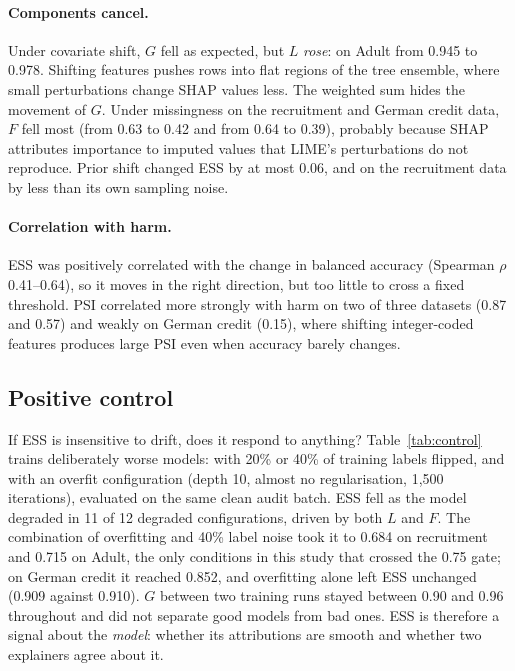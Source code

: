 \documentclass[11pt]{article}
\begin{document}
\paragraph{Components cancel.} Under covariate shift, \(G\) fell as expected, but \(L\) \emph{rose}: on Adult from 0.945 to 0.978.
Shifting features pushes rows into flat regions of the tree ensemble, where small perturbations change SHAP values less. The
weighted sum hides the movement of \(G\). Under missingness on the recruitment and German credit data, \(F\) fell most (from 0.63 to
0.42 and from 0.64 to 0.39), probably because SHAP attributes importance to imputed values that LIME's perturbations do not reproduce.
Prior shift changed ESS by at most 0.06, and on the recruitment data by less than its own sampling noise.

\paragraph{Correlation with harm.} ESS was positively correlated with the change in balanced accuracy (Spearman \(\rho\) 0.41--0.64), so
it moves in the right direction, but too little to cross a fixed threshold. PSI correlated more strongly with harm on two of three
datasets (0.87 and 0.57) and weakly on German credit (0.15), where shifting integer-coded features produces large PSI even when
accuracy barely changes.



\subsection{Positive control}
If ESS is insensitive to drift, does it respond to anything? Table~\ref{tab:control} trains deliberately worse models: with 20\% or 40\%
of training labels flipped, and with an overfit configuration (depth 10, almost no regularisation, 1{,}500 iterations), evaluated on the
same clean audit batch. ESS fell as the model degraded in 11 of 12 degraded configurations, driven by both \(L\) and \(F\). The
combination of overfitting and 40\% label noise took it to 0.684 on recruitment and 0.715 on Adult, the only conditions in this study
that crossed the 0.75 gate; on German credit it reached 0.852, and overfitting alone left ESS unchanged (0.909 against 0.910).
\(G\) between two training runs stayed between 0.90 and 0.96 throughout and did not separate good models from bad ones. ESS is
therefore a signal about the \emph{model}: whether its attributions are smooth and whether two explainers agree about it.
\end{document}
